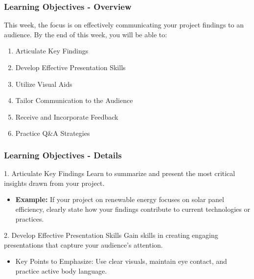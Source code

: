 \documentclass{beamer}
\begin{document}
\begin{frame}[fragile]
    \frametitle{Learning Objectives - Overview}
    This week, the focus is on effectively communicating your project findings to an audience. 
    By the end of this week, you will be able to:
    \begin{enumerate}
        \item Articulate Key Findings
        \item Develop Effective Presentation Skills
        \item Utilize Visual Aids
        \item Tailor Communication to the Audience
        \item Receive and Incorporate Feedback
        \item Practice Q\&A Strategies
    \end{enumerate}
\end{frame}

\begin{frame}[fragile]
    \frametitle{Learning Objectives - Details}
    \begin{block}{1. Articulate Key Findings}
        Learn to summarize and present the most critical insights drawn from your project. 
        \begin{itemize}
            \item \textbf{Example:} If your project on renewable energy focuses on solar panel efficiency, clearly state how your findings contribute to current technologies or practices.
        \end{itemize}
    \end{block}

    \begin{block}{2. Develop Effective Presentation Skills}
        Gain skills in creating engaging presentations that capture your audience’s attention.
        \begin{itemize}
            \item Key Points to Emphasize: Use clear visuals, maintain eye contact, and practice active body language.
        \end{itemize}
    \end{block}
\end{frame}
\end{document}
